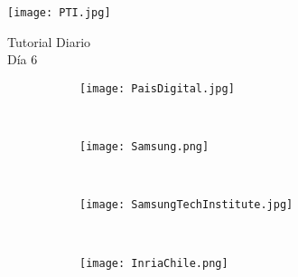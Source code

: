 \begin{titlepage} %
  \thispagestyle{empty} %
  \begin{flushleft} %
    \texttt{[image: PTI.jpg]}
  \end{flushleft}
  \vfill
  \vspace{2cm} %
  \begin{center} %
    {
      \Huge Tutorial Diario\\
      \huge Día 6
    }
  \end{center}

  \vspace{5cm}

  \begin{figure}[H]
    \centering
    \begin{subfigure}[b]{0.2\textwidth}
      \centering
      \texttt{[image: PaisDigital.jpg]}
      \label{fig:Viper}
    \end{subfigure}
    ~
    \begin{subfigure}[b]{0.4\textwidth}
      \centering
      \texttt{[image: Samsung.png]}
      \label{fig:Phyrex}
    \end{subfigure}
    ~
    \begin{subfigure}[b]{0.23\textwidth}
      \centering
      \texttt{[image: SamsungTechInstitute.jpg]}
      \label{fig:Viper}
    \end{subfigure}
    ~\\
    \begin{subfigure}[b]{0.4\textwidth}
      \centering
      \texttt{[image: InriaChile.png]}
      \label{fig:Phyrex}
    \end{subfigure}
  \end{figure}

  \vfill
\end{titlepage}
